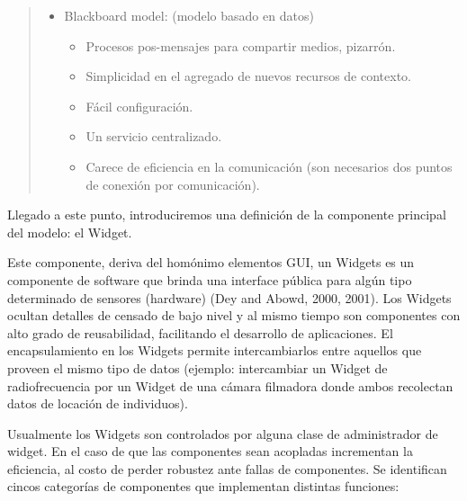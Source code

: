 \begin{quotation}
\begin{itemize}
\item Blackboard model: (modelo basado en datos) 	
	\begin{itemize}
	\item  Procesos pos-mensajes para compartir medios, pizarrón.
	\item Simplicidad en el agregado de nuevos recursos de contexto.
	\item Fácil configuración.
	\item Un servicio centralizado.
	\item Carece de eficiencia en la comunicación (son necesarios dos puntos
	de conexión por comunicación). 
	\end{itemize}

\end{itemize}                                
\end{quotation} 


Llegado a este punto, introduciremos una definición de la componente
principal del modelo: el Widget.


Este componente, deriva del homónimo elementos GUI, un Widgets es un componente de software que brinda una interface pública para algún tipo determinado de sensores (hardware) (Dey and Abowd, 2000, 2001). Los Widgets ocultan detalles de censado de bajo nivel y al mismo tiempo son componentes con alto grado de reusabilidad, facilitando el desarrollo de aplicaciones. El encapsulamiento en los Widgets permite intercambiarlos entre aquellos que proveen el mismo tipo de datos (ejemplo: intercambiar un Widget de radiofrecuencia por un Widget de una cámara filmadora donde ambos recolectan datos de locación de individuos).


Usualmente los Widgets son controlados por alguna clase de administrador de widget.
En el caso de que las componentes sean acopladas incrementan la eficiencia, al costo de perder robustez ante fallas de componentes. Se identifican cincos categorías de componentes que implementan distintas funciones:

